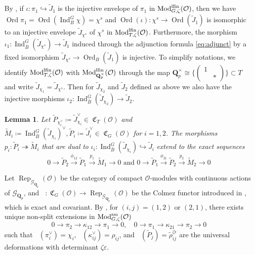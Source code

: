 \documentclass[leqno]{amsart}
\newtheorem{lem}[thm]{Lemma}
\theoremstyle{definition}
\theoremstyle{remark}
\newcommand{\smat}[1]{\left(\begin{smallmatrix} #1 \end{smallmatrix}\right)}
\newcommand{\oo}{\mathcal{O}}
\newcommand{\Qp}{\mathbf{Q}_p}
\DeclareMathOperator{\Ind}{Ind}
\DeclareMathOperator{\Mod}{\textnormal{Mod}}
\DeclareMathOperator{\fC}{\mathfrak{C}} %
\DeclareMathOperator{\Rep}{Rep}
\DeclareMathOperator{\V}{\check{\mathbf{V}}} %
\DeclareMathOperator{\Ord}{Ord} %
\newcommand{\Gp}{\mathcal{G}_{\Qp}} %
\newcommand{\sm}{\textnormal{sm}}
\newcommand{\lfin}{\textnormal{lfin}}
\begin{document}
By \cite[Prop 7.1]{pask},
if $\iota\colon \pi_1\hookrightarrow \tilde{J}_1$
is the injective envelope of $\pi_1$
in $\Mod^{\lfin}_{G,\zeta}(\oo)$,
then we have $\Ord\pi_1=\Ord(\Ind_B^G\chi)=\chi^s$
and $\Ord(\iota)\colon \chi^s \to \Ord(\tilde{J}_1)$
is isomorphic to an injective envelope
$\tilde{J}_{\chi^s}$ of $\chi^s$
in $\Mod^{\lfin}_{T,\zeta}(\oo)$.
Furthermore, the morphism 
$\iota_1\colon \Ind_{\bar{B}}^G(\tilde{J}_{\chi^s})\to
\tilde{J}_1$
induced through the adjunction formula \eqref{eq:adjunct}
by a fixed isomorphism
$\tilde{J}_{\chi^s}\to \Ord_B(\tilde{J}_1)$
is injective.
To simplify notations,
we identify $\Mod^{\lfin}_{T,\zeta}(\oo)$
with $\Mod^{\lfin}_{\Qp^\times}(\oo)$ through 
the map $\Qp^\times\cong \{\smat{1&\\&*}\}\subset T$
and write $\tilde{J}_{\chi_1}=\tilde{J}_{\chi^s}$.
Then for $ \tilde{J}_{\chi_2}$
and $ \tilde{J}_2$ defined as above
we also have the injective morphisms
$\iota_2\colon \Ind_{\bar{B}}^G(\tilde{J}_{\chi_2})\to
\tilde{J}_2$.


\begin{lem}\cite[Cor 7.7]{pask}
\label{lem:proj_enve}
Let $\tilde{P}_{\chi_i^\vee}\coloneqq \tilde{J}_{\chi_i}^\vee
\in\fC_T(\oo)$ and
$\tilde{M}_i\coloneqq 
\Ind_{\bar{B}}^G(\tilde{J}_{\chi_i})^\vee,
\tilde{P}_i\coloneqq \tilde{J}_i^\vee\in\fC_G(\oo)$
for $i=1,2$.
The morphisms
$p_i\colon \tilde{P}_i\twoheadrightarrow \tilde{M}_i$
that are dual to
$\iota_i\colon 
\Ind_{\bar{B}}^G(\tilde{J}_{\chi_i})\hookrightarrow 
\tilde{J}_i$ 
extend to the exact sequences
\begin{equation}\label{eq:exact_PPM}
	0\to \tilde{P}_{2}\xrightarrow{\phi_{12}} 
	\tilde{P}_{1}\xrightarrow{p_1} \tilde{M}_1\to 0 
	\text{ and }
	0\to \tilde{P}_{1}\xrightarrow{\phi_{21}} 
	\tilde{P}_{2}\xrightarrow{p_2} \tilde{M}_2\to 0
\end{equation}
\end{lem}

Let $\Rep_{\Gp}(\oo)$
be the category of compact $\oo$-modules with
continuous actions of $\Gp$,
and $\V\colon \fC_G(\oo)\to \Rep_{\Gp}(\oo)$
be the Colmez functor introduced 
in \cite[\S 5.7]{pask},
which is exact and covariant.
By \cite[Cor 8.7]{pask},
for $(i,j)=(1,2)$ or  $(2,1)$,
there exists unique non-split extensions
in $\Mod^{\sm}_{G,\zeta}(\oo)$ 
\[
	0\to \pi_2\to \kappa_{12}\to \pi_1\to 0,\quad
	0\to \pi_1\to \kappa_{21}\to \pi_2\to 0
\]
such that
$\V(\pi_i^\vee)=\chi_i$, $\V(\kappa_{ij}^\vee)=\rho_{ij}$,
and $\V(\tilde{P}_j)=\tilde{\rho}^{\zeta\epsilon}_{ij}$
are the universal deformations
with determinant $\zeta\varepsilon$.
\end{document}
